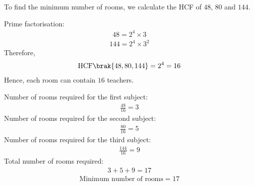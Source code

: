\begin{enumerate}[label=\thesubsection.\arabic*, ref=\thesubsection.\theenumi]
\solution
To find the minimum number of rooms, we calculate the HCF of \(48\), \(80\) and \(144\).

Prime factorisation:
\begin{align}
48 = 2^4 \times 3
\end{align}
\begin{align}
144 = 2^4 \times 3^2
\end{align}
Therefore,
\begin{align}
\mathrm{HCF}\brak{48,80,144}=2^4=16
\end{align}
Hence, each room can contain \(16\) teachers.

Number of rooms required for the first subject:
\begin{align}
\frac{48}{16}=3
\end{align}
Number of rooms required for the second subject:
\begin{align}
\frac{80}{16}=5
\end{align}
Number of rooms required for the third subject:
\begin{align}
\frac{144}{16}=9
\end{align}
Total number of rooms required:
\begin{align}
3+5+9=17
\end{align}
\begin{align}
\text{Minimum number of rooms}=17
\end{align}


\end{enumerate}
